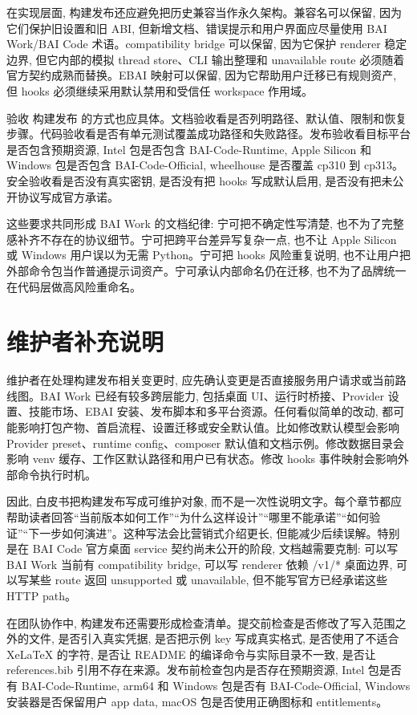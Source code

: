 在实现层面, 构建发布还应避免把历史兼容当作永久架构。兼容名可以保留, 因为它们保护旧设置和旧 ABI, 但新增文档、错误提示和用户界面应尽量使用 BAI Work/BAI Code 术语。compatibility bridge 可以保留, 因为它保护 renderer 稳定边界, 但它内部的模拟 thread store、CLI 输出整理和 unavailable route 必须随着官方契约成熟而替换。EBAI 映射可以保留, 因为它帮助用户迁移已有规则资产, 但 hooks 必须继续采用默认禁用和受信任 workspace 作用域。

验收 构建发布 的方式也应具体。文档验收看是否列明路径、默认值、限制和恢复步骤。代码验收看是否有单元测试覆盖成功路径和失败路径。发布验收看目标平台是否包含预期资源, Intel 包是否包含 BAI-Code-Runtime, Apple Silicon 和 Windows 包是否包含 BAI-Code-Official, wheelhouse 是否覆盖 cp310 到 cp313。安全验收看是否没有真实密钥, 是否没有把 hooks 写成默认启用, 是否没有把未公开协议写成官方承诺。

这些要求共同形成 BAI Work 的文档纪律: 宁可把不确定性写清楚, 也不为了完整感补齐不存在的协议细节。宁可把跨平台差异写复杂一点, 也不让 Apple Silicon 或 Windows 用户误以为无需 Python。宁可把 hooks 风险重复说明, 也不让用户把外部命令包当作普通提示词资产。宁可承认内部命名仍在迁移, 也不为了品牌统一在代码层做高风险重命名。

\section{维护者补充说明}

维护者在处理构建发布相关变更时, 应先确认变更是否直接服务用户请求或当前路线图。BAI Work 已经有较多跨层能力, 包括桌面 UI、运行时桥接、Provider 设置、技能市场、EBAI 安装、发布脚本和多平台资源。任何看似简单的改动, 都可能影响打包产物、首启流程、设置迁移或安全默认值。比如修改默认模型会影响 Provider preset、runtime config、composer 默认值和文档示例。修改数据目录会影响 venv 缓存、工作区默认路径和用户已有状态。修改 hooks 事件映射会影响外部命令执行时机。

因此, 白皮书把构建发布写成可维护对象, 而不是一次性说明文字。每个章节都应帮助读者回答“当前版本如何工作”“为什么这样设计”“哪里不能承诺”“如何验证”“下一步如何演进”。这种写法会比营销式介绍更长, 但能减少后续误解。特别是在 BAI Code 官方桌面 service 契约尚未公开的阶段, 文档越需要克制: 可以写 BAI Work 当前有 compatibility bridge, 可以写 renderer 依赖 /v1/* 桌面边界, 可以写某些 route 返回 unsupported 或 unavailable, 但不能写官方已经承诺这些 HTTP path。

在团队协作中, 构建发布还需要形成检查清单。提交前检查是否修改了写入范围之外的文件, 是否引入真实凭据, 是否把示例 key 写成真实格式, 是否使用了不适合 XeLaTeX 的字符, 是否让 README 的编译命令与实际目录不一致, 是否让 references.bib 引用不存在来源。发布前检查包内是否存在预期资源, Intel 包是否有 BAI-Code-Runtime, arm64 和 Windows 包是否有 BAI-Code-Official, Windows 安装器是否保留用户 app data, macOS 包是否使用正确图标和 entitlements。

